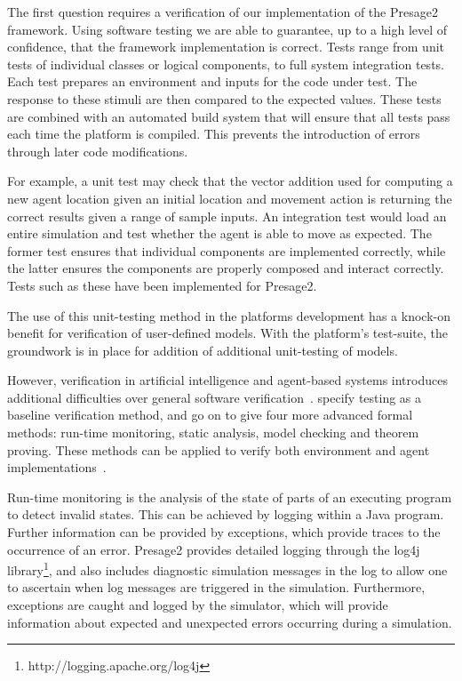 The first question requires a verification of our implementation of the Pres\-age2
framework. Using software testing we are able to guarantee, up to a high level of
confidence, that the framework implementation is correct. Tests range from unit
tests of individual classes or logical components, to full system integration
tests. Each test prepares an environment and inputs for the code under test. The
response to these stimuli are then compared to the expected values. These tests
are combined with an automated build system that will ensure that all tests pass
each time the platform is compiled. This prevents the introduction of errors
through later code modifications.

For example, a unit test may check that the vector addition used for computing
a new agent location given an initial location and movement action is
returning the correct results given a range of sample inputs. An integration
test would load an entire simulation and test whether the agent is able to
move as expected. The former test ensures that individual components are
implemented correctly, while the latter ensures the components are properly
composed and interact correctly. Tests such as these have been implemented for Presage2.

The use of this unit-testing method in the platforms development has a knock-on
benefit for verification of user-defined models. With the platform's test-suite,
the groundwork is in place for addition of additional unit-testing of models.

However, verification in artificial intelligence and agent-based systems
introduces additional difficulties over general software
verification~\citep{Wooldridge1998}. \citet{Menzies2005} specify testing as a
baseline verification method, and go on to give four more advanced formal
methods: run-time monitoring, static analysis, model checking and theorem
proving. These methods can be applied to verify both environment and agent
implementations~\citep{Sudeikat2007a}.

Run-time monitoring is the analysis of the state of parts of an executing
program to detect invalid states. This can be achieved by logging within a
Java program. Further information can be provided by exceptions, which provide
traces to the occurrence of an error. Presage2 provides detailed logging through
the log4j library\footnote{http://logging.apache.org/log4j}, and also includes diagnostic simulation messages in the log
to allow one to ascertain when log messages are triggered in the simulation.
Furthermore, exceptions are caught and logged by the simulator, which will
provide information about expected and unexpected errors occurring during a
simulation.

